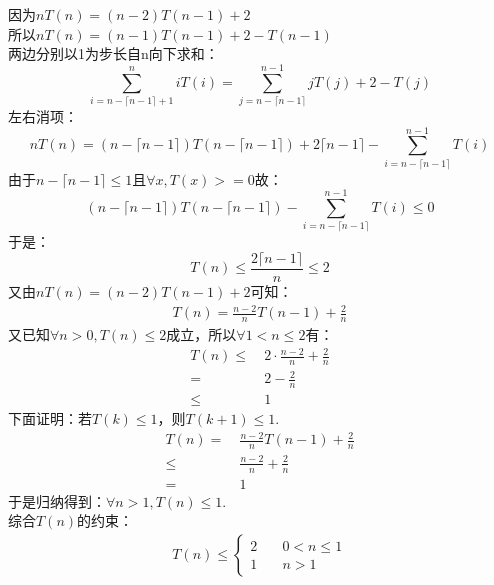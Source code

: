 \begin{solution}
    因为$nT(n)=(n-2)T(n-1)+2$\\
    所以$nT(n)=(n-1)T(n-1)+2-T(n-1)$\\
    两边分别以1为步长自n向下求和：
    \begin{displaymath}
        \sum_{i = n - \lceil n - 1 \rceil +1}^{n} iT(i) = 
        \sum_{j = n - \lceil n - 1 \rceil}^{n - 1} jT(j) + 2 - T(j) 
    \end{displaymath}
    左右消项：
    \begin{displaymath}
        nT(n) = (n - \lceil n - 1 \rceil)T(n - \lceil n - 1 \rceil) + 2 \lceil n - 1 \rceil - \sum_{i = n - \lceil n - 1 \rceil}^{n - 1} T(i)
    \end{displaymath}
    由于$n - \lceil n - 1 \rceil \le 1$且$\forall x, T(x)>=0$故：
    \begin{displaymath}
        (n - \lceil n - 1 \rceil)T(n - \lceil n - 1 \rceil) - \sum_{i = n - \lceil n - 1 \rceil}^{n - 1} T(i) \le 0
    \end{displaymath}   
    于是：
    $$T(n)\le \frac{2\lceil n - 1 \rceil}{n} \le 2$$
    又由$nT(n)=(n-2)T(n-1)+2$可知：
    \begin{align*}
        T(n)=\frac{n-2}{n}T(n-1)+\frac{2}{n}
    \end{align*}
    又已知$\forall n>0,T(n) \le 2$成立，所以$\forall 1 < n \le 2$有：
    \begin{align*}
        T(n) \le& ~2 \cdot\frac{n-2}{n}+ \frac{2}{n}\\
             =& ~2 - \frac{2}{n}\\
             \le& ~1
    \end{align*}
    下面证明：若$T(k)\le 1$，则$T(k+1) \le 1$.\\
    \begin{align*}
        T(n) =& ~\frac{n-2}{n}T(n-1)+\frac{2}{n}\\
        \le& ~\frac{n-2}{n}+\frac{2}{n}\\
        =& ~1
    \end{align*}
    于是归纳得到：$\forall n>1,T(n)\le 1$.\\
    综合$T(n)$的约束：
    \begin{align*}
       T(n) \le \left\{
        \begin{aligned}
            2& \quad 0 < n \le 1 \\
            1& \quad n > 1
        \end{aligned}
       \right.
    \end{align*}

\end{solution}

